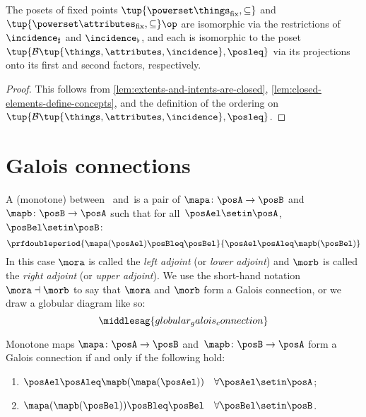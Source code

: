 \begin{lemma}
The posets of fixed points $\tup{\powerset \things_{\text{fix}}, \subseteq}$ and $\tup{\powerset \attributes_{\text{fix}}, \subseteq}\op$ are isomorphic via the restrictions of $\incidence_\sharp$ and $\incidence_\flat$, and each is isomorphic to the poset $\tup{\mathcal{B}\tup{\things, \attributes, \incidence}, \posleq}$ via its projections onto its first and second factors, respectively.
\end{lemma}

\begin{proof}
This follows from \cref{lem:extents-and-intents-are-closed}, \cref{lem:closed-elements-define-concepts}, and the definition of the ordering on $\tup{\mathcal{B}\tup{\things, \attributes, \incidence}, \posleq}$. 
\end{proof}

\section{Galois connections}\label{sec:galois-connections}


\begin{ctdefinition}\label{def:monotone-galois-connection}
    A (monotone)  between ~\posA and~\posB is a pair of 
    $\mapa\colon \posA\to \posB$ and~$\mapb\colon \posB\to \posA$ such that for all~$\posAel\setin \posA$,~$\posBel\setin \posB$:
    \begin{equation}
        \prfdoubleperiod{\mapa(\posAel) \posBleq \posBel}{\posAel \posAleq \mapb(\posBel)}
    \end{equation}
  In this case $\mora$ is called the \emph{left adjoint} (or \emph{lower adjoint}) and $\morb$ is called the \emph{right adjoint} (or \emph{upper adjoint}). We use the short-hand notation $\mora \dashv \morb$ to say that $\mora$ and $\morb$ form a Galois connection, or we draw a globular diagram like so:  
    \begin{equation}
    \middlesag{globular_galois_connection}
\end{equation}
\end{ctdefinition}

\begin{lemma}\label{lem:alternative-def-Galois-connection}
Monotone maps $\mapa\colon \posA\to \posB$ and~$\mapb\colon \posB\to \posA$ form a Galois connection if and only if the following hold: 
\begin{enumerate}
\item $\posAel\posAleq \mapb(\mapa(\posAel)) \quad \forall \posAel\setin \posA$;
\item $\mapa(\mapb(\posBel)) \posBleq \posBel \quad \forall \posBel\setin \posB$. 
\end{enumerate}
\end{lemma}


